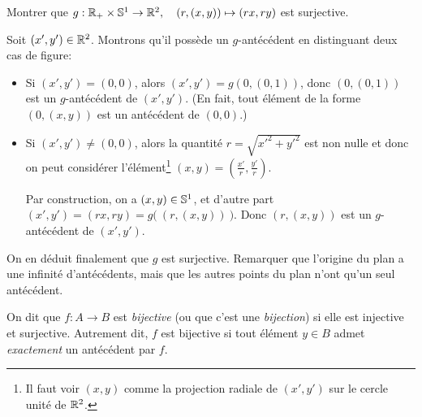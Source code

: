 \begin{exercice}\label{exo-decomp-polaire}
Montrer que $g : \R_+\times \S^1 \to \R^2, \quad (r,(x,y))\mapsto (rx,ry)$ est surjective.
\end{exercice}
\begin{red}
Soit $(x',y')\in \R^2$. Montrons qu'il possède un $g$-antécédent en distinguant deux cas de figure:
\begin{itemize}
\item Si $(x',y')=(0,0)$, alors $(x',y')=g(0,(0,1))$, donc $(0,(0,1))$ est un $g$-antécédent de $(x',y')$. (En fait, tout élément de la forme $(0,(x,y))$ est un antécédent de $(0,0)$.)
\item Si $(x',y')\neq (0,0)$, alors la quantité $r=\sqrt{x'^2+y'^2}$ est non nulle et donc on peut considérer l'élément\footnote{Il faut  voir $(x,y)$ comme la projection radiale de $(x',y')$ sur le cercle unité de $\R^2$.} $(x,y)=\left(\frac{x'}{r},\frac{y'}{r}\right)$.

Par construction, on a $(x,y)\in \S^1$, et d'autre part $(x',y')=(rx,ry)=g\big(\:(r,(x,y))\:\big)$. Donc $(r,(x,y))$ est un $g$-antécédent de $(x',y')$. 
\end{itemize}
On en déduit finalement que $g$ est surjective. Remarquer que l'origine du plan a une infinité d'antécédents, mais que les autres points du plan n'ont qu'un seul antécédent.
\end{red}





\begin{definition}
On dit que $f : A\to B$ est \emph{bijective} (ou que c'est une \emph{bijection}) si elle est injective et surjective. Autrement dit, $f$ est bijective si tout élément $y\in B$ admet \emph{exactement} un antécédent par $f$.
\end{definition}

